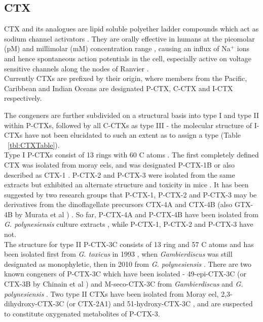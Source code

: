 \documentclass[12pt]{article}
\begin{document}
\subsection{CTX}
CTX and its analogues are lipid soluble polyether ladder compounds which act as sodium channel activators \cite{dechraoui1999ciguatoxins}. They are orally effective in humans at the picomolar (pM) and millimolar (mM) concentration range \cite{molgo2000ciguatera}, causing an influx of Na$^{+}$ ions and hence spontaneous action potentials in the cell, especially active on voltage sensitive channels along the nodes of Ranvier \cite{sims1987theoretical,mattei1999neurotoxins,lewis1992action,molgo2000ciguatera}. \\
Currently CTXs are prefixed by their origin, where members from the Pacific, Caribbean and Indian Oceans are designated P-CTX, C-CTX and I-CTX respectively. %

The congeners are further subdivided on a structural basis into type I and type II within P-CTXs, followed by all C-CTXs as type III - the molecular structure of I-CTXs have not been elucidated to such an extent as to assign a type \cite{legrand1997two,hamilton2002multiple,hamilton2002isolation} (Table ~\ref{tbl:CTXTable}).  \\

Type I P-CTXs consist of 13 rings with 60 C atoms \cite{murata1990structures,lewis1991purification,lewis1993origin}. The first completely defined CTX was isolated from moray eels, and was designated P-CTX-1B \cite{murata1990structures} or also described as CTX-1 \cite{lewis1991purification}. P-CTX-2 and P-CTX-3 were isolated from the same extracts but exhibited an alternate structure and toxicity in mice \cite{lewis1991purification}. It has been suggested by two research groups that P-CTX-1, P-CTX-2 and P-CTX-3 may be derivatives from the dinoflagellate precursors CTX-4A and CTX-4B (also GTX-4B by Murata et al \cite{murata1990structures}) \cite{lewis1993origin,yasumoto2000structural}. So far, P-CTX-4A and P-CTX-4B have been isolated from \emph{G. polynesiensis} culture extracts \cite{chinain2010growth}, while P-CTX-1, P-CTX-2 and P-CTX-3 have not. \\

The structure for type II P-CTX-3C consists of 13 ring and 57 C atoms and has been isolated first from \emph{G. toxicus} in 1993 \cite{satake1993structure}, when \emph{Gambierdiscus} was still designated as monophyletic, then in 2010 from \emph{G. polynesiensis} \cite{chinain2010growth}. There are two known congeners of P-CTX-3C which have been isolated - 49-epi-CTX-3C (or CTX-3B by Chinain et al \cite{chinain2010growth}) and M-seco-CTX-3C from \emph{Gambierdiscus} \cite{satake1993structure} and \emph{G. polynesiensis} \cite{chinain2010growth}. Two type II CTXs have been isolated from Moray eel, 2,3-dihydroxy-CTX-3C (or CTX-2A1) and 51-hydroxy-CTX-3C \cite{satake1998isolation}, and are suspected to constitute oxygenated metabolites of P-CTX-3. \\ %
\end{document}
